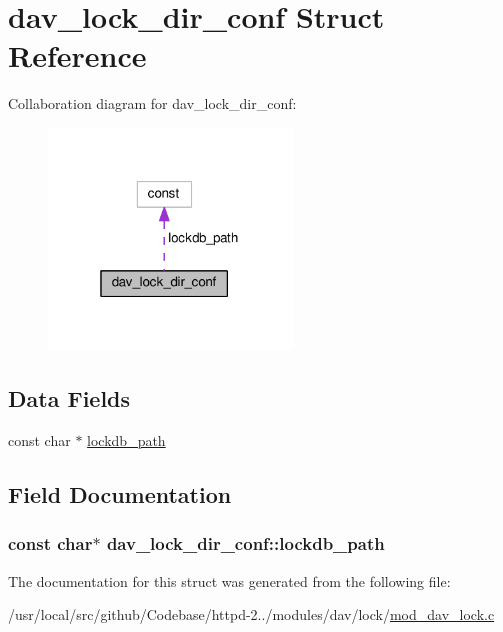 \hypertarget{structdav__lock__dir__conf}{}\section{dav\+\_\+lock\+\_\+dir\+\_\+conf Struct Reference}
\label{structdav__lock__dir__conf}


Collaboration diagram for dav\+\_\+lock\+\_\+dir\+\_\+conf\+:
\nopagebreak
\begin{figure}[H]
\begin{center}
\leavevmode
\includegraphics[width=184pt]{structdav__lock__dir__conf__coll__graph}
\end{center}
\end{figure}
\subsection*{Data Fields}
\begin{DoxyCompactItemize}
\item 
const char $\ast$ \hyperlink{structdav__lock__dir__conf_a3b0883b5d7ab6e40cb7d248c5f4cb1aa}{lockdb\+\_\+path}
\end{DoxyCompactItemize}


\subsection{Field Documentation}
\subsubsection[{\texorpdfstring{lockdb\+\_\+path}{lockdb_path}}]{\setlength{\rightskip}{0pt plus 5cm}const char$\ast$ dav\+\_\+lock\+\_\+dir\+\_\+conf\+::lockdb\+\_\+path}\hypertarget{structdav__lock__dir__conf_a3b0883b5d7ab6e40cb7d248c5f4cb1aa}{}\label{structdav__lock__dir__conf_a3b0883b5d7ab6e40cb7d248c5f4cb1aa}


The documentation for this struct was generated from the following file\+:\begin{DoxyCompactItemize}
\item 
/usr/local/src/github/\+Codebase/httpd-\/2../modules/dav/lock/\hyperlink{mod__dav__lock_8c}{mod\+\_\+dav\+\_\+lock.\+c}\end{DoxyCompactItemize}
